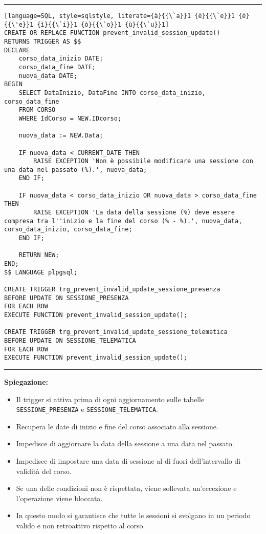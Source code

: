\noindent\rule{\textwidth}{0.4pt}
\begin{lstlisting}[language=SQL, style=sqlstyle, literate={à}{{\`a}}1 {è}{{\`e}}1 {é}{{\'e}}1 {ì}{{\`i}}1 {ò}{{\`o}}1 {ù}{{\`u}}1]
CREATE OR REPLACE FUNCTION prevent_invalid_session_update()
RETURNS TRIGGER AS $$
DECLARE
    corso_data_inizio DATE;
    corso_data_fine DATE;
    nuova_data DATE;
BEGIN
    SELECT DataInizio, DataFine INTO corso_data_inizio, corso_data_fine
    FROM CORSO
    WHERE IdCorso = NEW.IDcorso;

    nuova_data := NEW.Data;

    IF nuova_data < CURRENT_DATE THEN
        RAISE EXCEPTION 'Non è possibile modificare una sessione con una data nel passato (%).', nuova_data;
    END IF;

    IF nuova_data < corso_data_inizio OR nuova_data > corso_data_fine THEN
        RAISE EXCEPTION 'La data della sessione (%) deve essere compresa tra l''inizio e la fine del corso (% - %).', nuova_data, corso_data_inizio, corso_data_fine;
    END IF;

    RETURN NEW;
END;
$$ LANGUAGE plpgsql;

CREATE TRIGGER trg_prevent_invalid_update_sessione_presenza
BEFORE UPDATE ON SESSIONE_PRESENZA
FOR EACH ROW
EXECUTE FUNCTION prevent_invalid_session_update();

CREATE TRIGGER trg_prevent_invalid_update_sessione_telematica
BEFORE UPDATE ON SESSIONE_TELEMATICA
FOR EACH ROW
EXECUTE FUNCTION prevent_invalid_session_update();
\end{lstlisting}
\noindent\rule{\textwidth}{0.4pt}

\textbf{Spiegazione:}
\begin{itemize}
    \item Il trigger si attiva prima di ogni aggiornamento sulle tabelle \texttt{SESSIONE\_PRESENZA} e \texttt{SESSIONE\_TELEMATICA}.
    \item Recupera le date di inizio e fine del corso associato alla sessione.
    \item Impedisce di aggiornare la data della sessione a una data nel passato.
    \item Impedisce di impostare una data di sessione al di fuori dell’intervallo di validità del corso.
    \item Se una delle condizioni non è rispettata, viene sollevata un’eccezione e l’operazione viene bloccata.
    \item In questo modo si garantisce che tutte le sessioni si svolgano in un periodo valido e non retroattivo rispetto al corso.
\end{itemize}

